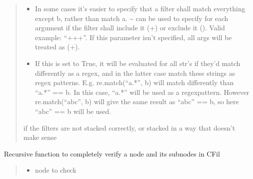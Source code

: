 \documentclass[a4paper,10pt,english]{sphinxmanual}
\begin{document}
\begin{fulllineitems}
\begin{fulllineitems}
\begin{quote}
\begin{description}
\begin{itemize}
\item {}
\sphinxAtStartPar
{} \textendash{} In some cases it’s easier to specify that a filter shall match everything except b, rather than
match a. \textasciitilde{} can be used to specify for each argument if the filter shall include it (+) or exclude it
(\sphinxhyphen{}). Valid example: “++\sphinxhyphen{}+”. If this parameter isn’t specified, all args will be treated as (+).

\item {}
\sphinxAtStartPar
{} \textendash{} If this is set to True, it will be evaluated for all str’s if they’d match differently as a
regex, and in the latter case match these strings as regex patterns. E.g. re.match(“a.*”, b) will match
differently than “a.*” == b. In this case, “a.*” will be used as a regex\sphinxhyphen{}pattern. However
re.match(“abc”, b) will give the same result as “abc” == b, so here “abc” == b will be used.

\end{itemize}

\sphinxAtStartPar
{} \textendash{} if the filters are not stacked correctly, or stacked in a way that doesn’t make sense

\end{description}\end{quote}

\end{fulllineitems}


\begin{fulllineitems}
\label{\detokenize{fagus.filters:fagus.filters.CFil.match_node}}
\pysigstartsignatures
{}
\pysigstopsignatures
\sphinxAtStartPar
Recursive function to completely verify a node and its subnodes in CFil
\begin{quote}\begin{description}
\begin{itemize}
\item {}
\sphinxAtStartPar
{} \textendash{} node to check


\end{itemize}
\end{description}
\end{quote}
\end{fulllineitems}
\end{fulllineitems}
\end{document}
